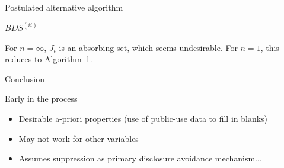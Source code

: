 \begin{frame}[fragile]{Postulated alternative algorithm}
\begin{block}{$BDS^{(ii)}$}
\begin{algorithm}
\begin{algorithmic}
\EndIf
{}

\end{algorithmic}
\end{algorithm}

For $n=\infty$, $J_{t}$ is an absorbing set, which seems undesirable. For $n=1$, this reduces  to 
Algorithm~1.
\end{block}
\end{frame}




\begin{frame}{Conclusion}
\begin{block}{Early in the process}
\begin{itemize}
\item Desirable a-priori properties (use of public-use data to fill in blanks)
\item May not work for other variables
\item Assumes suppression as primary disclosure avoidance mechanism...
\end{itemize}\end{block}
\end{frame}

